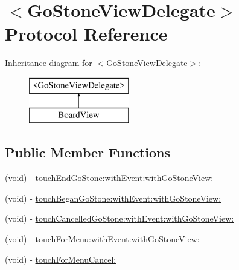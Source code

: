 \hypertarget{protocol_go_stone_view_delegate-p}{
\section{$<$GoStoneViewDelegate$>$ Protocol Reference}
\label{protocol_go_stone_view_delegate-p}
}
Inheritance diagram for $<$GoStoneViewDelegate$>$:\begin{figure}[H]
\begin{center}
\leavevmode
\includegraphics[height=2.000000cm]{protocol_go_stone_view_delegate-p}
\end{center}
\end{figure}
\subsection*{Public Member Functions}
\begin{DoxyCompactItemize}
\item 
(void) -\/ \hyperlink{protocol_go_stone_view_delegate-p_ae3e9a51bdc406bb84dac040a230f7a30}{touchEndGoStone:withEvent:withGoStoneView:}
\item 
(void) -\/ \hyperlink{protocol_go_stone_view_delegate-p_afdeb52c59c0ee0dac201248b5d045273}{touchBeganGoStone:withEvent:withGoStoneView:}
\item 
(void) -\/ \hyperlink{protocol_go_stone_view_delegate-p_a07484195a52b7ba48480dd9663068a29}{touchCancelledGoStone:withEvent:withGoStoneView:}
\item 
(void) -\/ \hyperlink{protocol_go_stone_view_delegate-p_a5dc26eecd36a2e3bf5418bd5bddcac85}{touchForMenu:withEvent:withGoStoneView:}
\item 
(void) -\/ \hyperlink{protocol_go_stone_view_delegate-p_ac00e76ede506ec4057e336b78b2446d6}{touchForMenuCancel:}
\end{DoxyCompactItemize}


